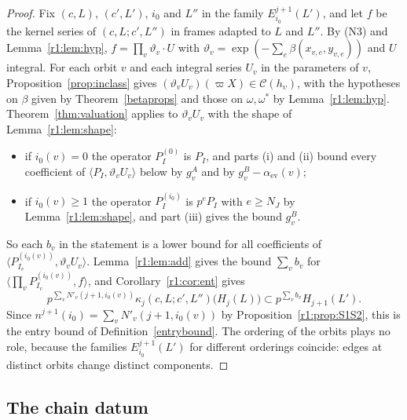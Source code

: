 \begin{proof}
Fix $(c,L)$, $(c',L')$, $i_0$ and $L''$ in the family $E^{j+1}_{i_0}(L')$, and let $f$ be the kernel series of $(c,L;c',L'')$ in frames adapted to $L$ and $L''$. By (N3) and Lemma~\ref{r1:lem:hyp}, $f=\prod_v\vartheta_v\cdot U$ with $\vartheta_v=\exp(-\sum_e\beta(x_{v,e},y_{v,e}))$ and $U$ integral. For each orbit $v$ and each integral series $U_v$ in the parameters of $v$, Proposition~\ref{prop:inclass} gives $(\vartheta_vU_v)(\varpi X)\in\mathcal C(h_{\upsilon})$, with the hypotheses on $\beta$ given by Theorem~\ref{betaprops} and those on $\omega,\omega^\ast$ by Lemma~\ref{r1:lem:hyp}. Theorem~\ref{thm:valuation} applies to $\vartheta_vU_v$ with the shape of Lemma~\ref{r1:lem:shape}:
\begin{itemize}
\item if $i_0(v)=0$ the operator $P^{(0)}_{I}$ is $P_I$, and parts (i) and (ii) bound every coefficient of $\langle P_I,\vartheta_vU_v\rangle$ below by $g^A_v$ and by $g^B_v-\alpha_{\mathrm{ev}}(v)$;
\item if $i_0(v)\ge1$ the operator $P^{(i_0)}_I$ is $p^{e}P_I$ with $e\ge N_J$ by Lemma~\ref{r1:lem:shape}, and part (iii) gives the bound $g^B_v$.
\end{itemize}
So each $b_v$ in the statement is a lower bound for all coefficients of $\langle P^{(i_0(v))}_{I_v},\vartheta_vU_v\rangle$. Lemma~\ref{r1:lem:add} gives the bound $\sum_vb_v$ for $\langle\prod_vP^{(i_0(v))}_{I_v},f\rangle$, and Corollary~\ref{r1:cor:ent} gives
\[
p^{\sum_vN'_v(j+1,i_0(v))}\kappa_j(c,L;c',L'')\big(H_j(L)\big)\subset p^{\sum_vb_v}H_{j+1}(L').
\]
Since $n^{j+1}(i_0)=\sum_vN'_v(j+1,i_0(v))$ by Proposition~\ref{r1:prop:S1S2}, this is the entry bound of Definition~\ref{entrybound}. The ordering of the orbits plays no role, because the families $E^{j+1}_{i_0}(L')$ for different orderings coincide: edges at distinct orbits change distinct components.
\end{proof}

\subsection{The chain datum}\label{r1:sec:R1hyp}

